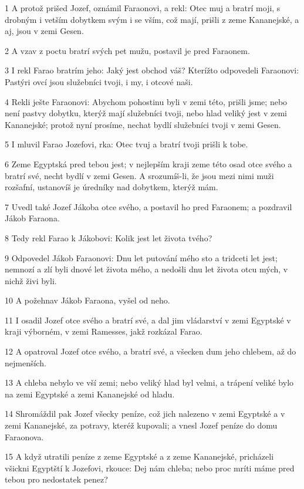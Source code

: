 \par 1 A protož prišed Jozef, oznámil Faraonovi, a rekl: Otec muj a bratrí moji, s drobným i vetším dobytkem svým i se vším, což mají, prišli z zeme Kananejské, a aj, jsou v zemi Gesen.
\par 2 A vzav z poctu bratrí svých pet mužu, postavil je pred Faraonem.
\par 3 I rekl Farao bratrím jeho: Jaký jest obchod váš? Kterížto odpovedeli Faraonovi: Pastýri ovcí jsou služebníci tvoji, i my, i otcové naši.
\par 4 Rekli ješte Faraonovi: Abychom pohostinu byli v zemi této, prišli jsme; nebo není pastvy dobytku, kterýž mají služebníci tvoji, nebo hlad veliký jest v zemi Kananejské; protož nyní prosíme, nechat bydlí služebníci tvoji v zemi Gesen.
\par 5 I mluvil Farao Jozefovi, rka: Otec tvuj a bratrí tvoji prišli k tobe.
\par 6 Zeme Egyptská pred tebou jest; v nejlepším kraji zeme této osad otce svého a bratrí své, necht bydlí v zemi Gesen. A srozumíš-li, že jsou mezi nimi muži rozšafní, ustanovíš je úredníky nad dobytkem, kterýž mám.
\par 7 Uvedl také Jozef Jákoba otce svého, a postavil ho pred Faraonem; a pozdravil Jákob Faraona.
\par 8 Tedy rekl Farao k Jákobovi: Kolik jest let života tvého?
\par 9 Odpovedel Jákob Faraonovi: Dnu let putování mého sto a tridceti let jest; nemnozí a zlí byli dnové let života mého, a nedošli dnu let života otcu mých, v nichž živi byli.
\par 10 A požehnav Jákob Faraona, vyšel od neho.
\par 11 I osadil Jozef otce svého a bratrí své, a dal jim vládarství v zemi Egyptské v kraji výborném, v zemi Ramesses, jakž rozkázal Farao.
\par 12 A opatroval Jozef otce svého, a bratrí své, a všecken dum jeho chlebem, až do nejmenších.
\par 13 A chleba nebylo ve vší zemi; nebo veliký hlad byl velmi, a trápení veliké bylo na zemi Egyptské a zemi Kananejské od hladu.
\par 14 Shromáždil pak Jozef všecky peníze, což jich nalezeno v zemi Egyptské a v zemi Kananejské, za potravy, kteréž kupovali; a vnesl Jozef peníze do domu Faraonova.
\par 15 A když utratili peníze z zeme Egyptské a z zeme Kananejské, pricházeli všickni Egyptští k Jozefovi, rkouce: Dej nám chleba; nebo proc mríti máme pred tebou pro nedostatek penez?

